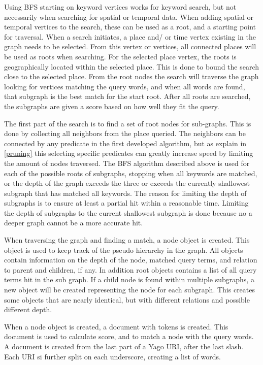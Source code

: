 Using BFS starting on keyword vertices works for keyword search, but not necessarily when searching for spatial or temporal data. When adding spatial or temporal vertices to the search, these can be used as a root, and a starting point for traversal. When a search initiates, a place and/ or time vertex existing in the graph needs to be selected. From this vertex or vertices, all connected places will be used as roots when searching. For the selected place vertex, the roots is geographically located within the selected place. This is done to bound the search close to the selected place. From the root nodes the search will traverse the graph looking for vertices matching the query words, and when all words are found, that subgraph is the best match for the start root. After all roots are searched, the subgraphs are given a score based on how well they fit the query.

The first part of the search is to find a set of root nodes for sub-graphs. This is done by collecting all neighbors from the place queried. The neighbors can be connected by any predicate in the first developed algorithm, but as explain in \ref{pruning} this selecting specific predicates can greatly increase speed by limiting the amount of nodes traversed. The BFS algorithm described above is used for each of the possible roots of subgraphs, stopping when all keywords are matched, or the depth of the graph exceeds the three or exceeds the currently shallowest subgraph that has matched all keywords. The reason for limiting the depth of subgraphs is to ensure at least a partial hit within a reasonable time. Limiting the depth of subgraphs to the current shallowest subgraph is done because no a deeper graph cannot be a more accurate hit.

When traversing the graph and finding a match, a node object is created. This object is used to keep track of the pseudo hierarchy in the graph. All objects contain information on the depth of the node, matched query terms, and relation to parent and children, if any. In addition root objects contains a list of all query terms hit in the sub graph. If a child node is found within multiple subgraphs, a new object will be created representing the node for each subgraph. This creates some objects that are nearly identical, but with different relations and possible different depth.

When a node object is created, a document with tokens is created. This document is used to calculate score, and to match a node with the query words. A document is created from the last part of a Yago URI, after the last slash. Each URI si further split on each underscore, creating a list of words. 


